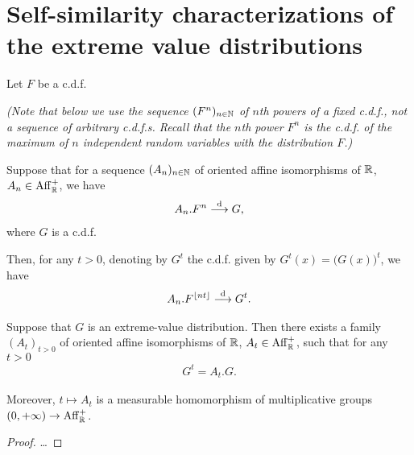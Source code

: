 \section{Self-similarity characterizations of the extreme value distributions}

\begin{lemma}
  \label{lem:continuous-parameter-ev-limit}
  Let $F$ be a c.d.f.

  \emph{(Note that below we use
  the sequence $(F^n)_{n \in \mathbb{N}}$ of $n$th powers of a fixed c.d.f.,
  not a sequence of arbitrary c.d.f.s.
  Recall that the $n$th power $F^n$ is the c.d.f. of the maximum
  of $n$ independent random variables with the distribution $F$.)}

  Suppose that for a sequence $(A_n)_{n \in \mathbb{N}}$ of oriented
  affine isomorphisms of $\mathbb{R}$, $A_n \in \mathrm{Aff}^+_{\mathbb{R}}$, we have
  \begin{align*}
    A_n.F^n \overset{\mathrm{d}}{\longrightarrow} G ,
  \end{align*}
  where $G$ is a c.d.f.

  Then, for any $t > 0$, denoting by $G^t$ the c.d.f. given by
  $G^t(x) = \big( G(x) \big)^t$, we have
  \begin{align*}
    A_{n}.F^{\lfloor n t \rfloor} \overset{\mathrm{d}}{\longrightarrow} G^t .
  \end{align*}
\end{lemma}

\begin{lemma}
  \label{lem:self-similarity-of-extreme-value-distributions}
  Suppose that $G$ is an extreme-value distribution.
  Then there exists a family $(A_t)_{t > 0}$ of
  oriented affine isomorphisms of $\mathbb{R}$, $A_t \in \mathrm{Aff}^+_{\mathbb{R}}$,
  such that for any $t > 0$
  \begin{align*}
    G^t = A_t . G .
  \end{align*}

  Moreover, $t \mapsto A_t$ is a measurable homomorphism
  of multiplicative groups $(0,+\infty) \to \mathrm{Aff}^+_{\mathbb{R}}$.
\end{lemma}
\begin{proof}
  \ldots
\end{proof}

